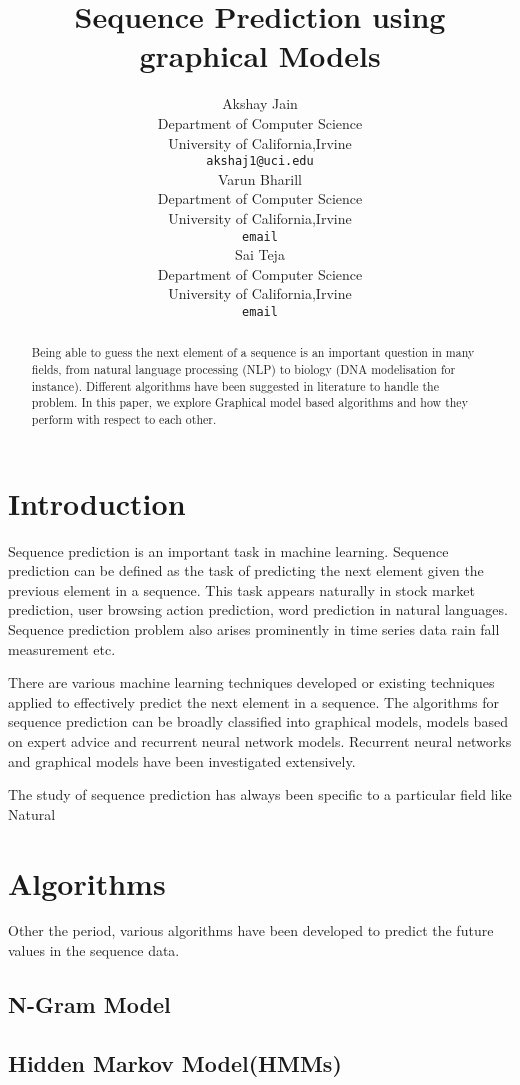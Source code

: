 \documentclass{article} %
\title{Sequence Prediction using graphical Models }
\author{
Akshay Jain\\
Department of Computer Science\\
University of California,Irvine \\
\texttt{akshaj1@uci.edu} \\
\And
Varun Bharill \\
Department of Computer Science\\
University of California,Irvine \\
\texttt{email} \\
\And
Sai Teja \\
Department of Computer Science\\
University of California,Irvine \\
\texttt{email} \\
}
\begin{document}
\maketitle

\begin{abstract}
Being able to guess the next element of a sequence is an important question in many fields, from natural language processing (NLP) to biology (DNA modelisation for instance). Different algorithms have been suggested in literature to handle the problem. In this paper, we explore Graphical model based algorithms and how they perform with respect to each other.
\end{abstract}

\section{Introduction}
\label{Introduction}
\label{Introduction}
Sequence prediction is an important task in machine learning. Sequence prediction can be defined as the task of predicting the next element given the previous element in a sequence. This task appears naturally in stock market prediction, user browsing action prediction, word prediction in natural languages. Sequence prediction problem also arises prominently in time series data rain fall measurement etc. 

There are various machine learning techniques developed or existing techniques applied to effectively predict the next element in a sequence. The algorithms for sequence prediction can be broadly classified into graphical models, models based on expert advice and recurrent neural network models. Recurrent neural networks and graphical models have been investigated extensively. 

The study of sequence prediction has always been specific to a particular field like Natural 

\section{Algorithms}
\label{Algorithms}
Other the period, various algorithms have been developed to predict the future values in the sequence data. 
\subsection{N-Gram Model}

\subsection{Hidden Markov Model(HMMs)}
\end{document}
